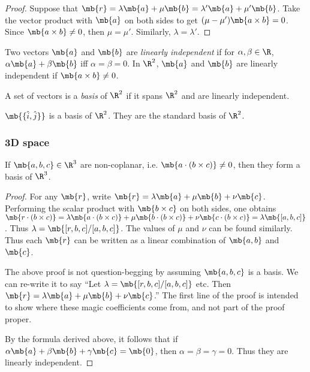 \documentclass[a4paper]{article}
\begin{document}
\begin{proof}
  Suppose that $\mb{r} = \lambda\mb{a} + \mu\mb{b} = \lambda'\mb{a} + \mu'\mb{b}$. Take the vector product with $\mb{a}$ on both sides to get $(\mu - \mu')\mb{a\times b} = 0$. Since $\mb{a\times b}\not= 0$, then $\mu=\mu'$. Similarly, $\lambda = \lambda'$.
\end{proof}

\begin{defi}
  Two vectors $\mb{a}$ and $\mb{b}$ are \emph{linearly independent} if  for $\alpha, \beta\in \R$, $\alpha\mb{a} + \beta\mb{b}$ iff $\alpha = \beta = 0$. In $\R^2$, $\mb{a}$ and $\mb{b}$ are linearly independent if $\mb{a\times b} \not= 0$.
\end{defi}

\begin{defi}[Basis of $\R^2$]
  A set of vectors is a \emph{basis} of $\R^2$ if it spans $\R^2$ and are linearly independent.
\end{defi}

\begin{eg}
  $\mb{\{\hat{i}, \hat{j}\}}$ is a basis of $\R^2$. They are the standard basis of $\R^2$.
\end{eg}

\subsubsection{3D space}
\begin{thm}
  If $\mb{a, b, c}\in\R^3$ are non-coplanar, i.e. $\mb{a\cdot(b\times c)}\not= 0$, then they form a basis of $\R^3$.
\end{thm}

\begin{proof}
  For any $\mb{r}$, write $\mb{r} = \lambda\mb{a} + \mu\mb{b} + \nu\mb{c}$. Performing the scalar product with $\mb{b\times c}$ on both sides, one obtains $\mb{r\cdot(b\times c)} = \lambda \mb{a\cdot(b\times c)} + \mu\mb{b\cdot (b\times c)} + \nu\mb{c\cdot(b\times c)} = \lambda \mb{[a, b, c]}$. Thus $\lambda = \mb{[r, b, c]/[a,b, c]}$. The values of $\mu$ and $\nu$ can be found similarly. Thus each $\mb{r}$ can be written as a linear combination of $\mb{a, b}$ and $\mb{c}$.

\note The above proof is not question-begging by assuming $\mb{a, b, c}$ is a basis. We can re-write it to say ``Let $\lambda = \mb{[r, b, c]/[a,b, c]}$ etc. Then $\mb{r} = \lambda\mb{a} + \mu\mb{b} + \nu\mb{c}$.'' The first line of the proof is intended to show where these magic coefficients come from, and not part of the proof proper.

By the formula derived above, it follows that if $\alpha\mb{a} + \beta\mb{b} + \gamma\mb{c} = \mb{0}$, then $\alpha = \beta = \gamma = 0$. Thus they are linearly independent.
\end{proof}
\end{document}
